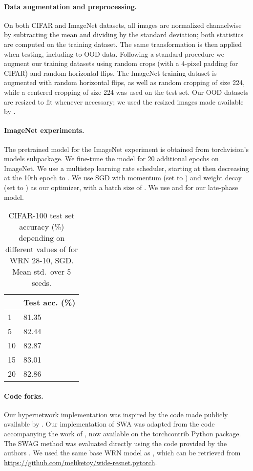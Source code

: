 \documentclass{article} \usepackage{iclr2021_conference,times}
\begin{document}
\paragraph{Data augmentation and preprocessing.} On both CIFAR and ImageNet datasets, all images are normalized channelwise by subtracting the mean and dividing by the standard deviation; both statistics are computed on the training dataset. The same transformation is then applied when testing, including to OOD data. Following a standard procedure \citep[e.g.,][]{zagoruyko_wide_2016,he_deep_2016} we augment our training datasets using random crops (with a 4-pixel padding for CIFAR) and random horizontal flips. The ImageNet training dataset is augmented with random horizontal flips, as well as random cropping of size 224, while a centered cropping of size 224 was used on the test set. Our OOD datasets are resized to fit whenever necessary; we used the resized images made available by \citet{lee_simple_2018}.

\paragraph{ImageNet experiments.} The pretrained model for the ImageNet experiment is obtained from torchvision's models subpackage. We fine-tune the model for 20 additional epochs on ImageNet. We use a multistep learning rate scheduler, starting at  then decreasing at the 10th epoch to . We use SGD with momentum (set to ) and weight decay (set to ) as our optimizer, with a batch size of . We use  and  for our late-phase model.

\begin{wraptable}[13]{R}{0.45\textwidth}
\centering
\caption{CIFAR-100 test set accuracy (\%) depending on different values of  for WRN 28-10, SGD. Mean  std.~over 5 seeds.\label{tab:k-sensitivity}}
\begin{tabular}{ll}
\toprule
    & Test acc. (\%) \\\midrule
1 &  81.35     \\
5 & 82.44  \\
10  & 82.87  \\
15  & 83.01  \\
20  & 82.86  \\
\bottomrule  
\end{tabular}
\end{wraptable}

\paragraph{Code forks.}
Our hypernetwork implementation was inspired by the code made publicly available by \citet{savarese_learning_2019}. Our implementation of SWA was adapted from the code accompanying the work of \citet{izmailov_averaging_2018}, now available on the torchcontrib Python package. The SWAG method was evaluated directly using the code provided by the authors \citep{maddox_simple_2019}. We used the same base WRN model as \citet{maddox_simple_2019}, which can be retrieved from \url{https://github.com/meliketoy/wide-resnet.pytorch}.
\end{document}
